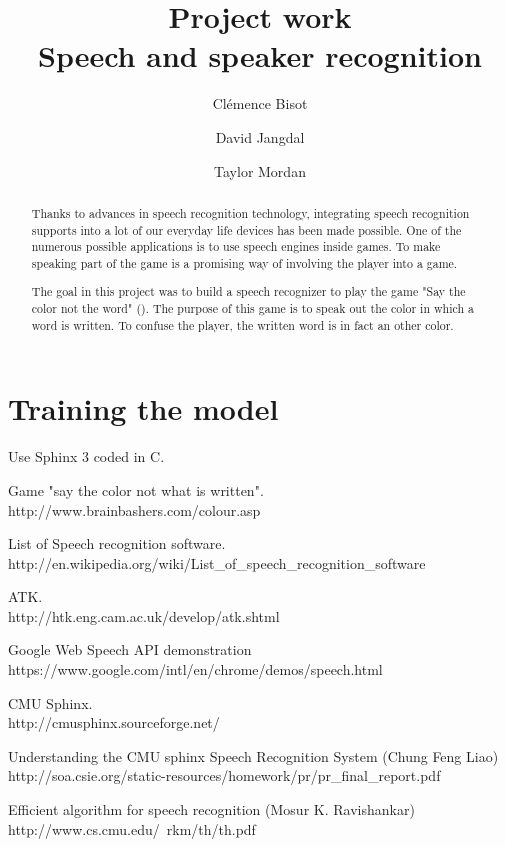 \documentclass{report}
\begin{document}
\title{Project work \\ Speech and speaker recognition}
\author{Cl\'{e}mence Bisot \and David Jangdal \and Taylor Mordan}
\maketitle

\begin{abstract}
Thanks to advances in speech recognition technology, integrating speech recognition supports into a lot of our everyday life devices has been made possible. One of the numerous possible applications is to use speech engines inside games. To make speaking part of the game is a promising way of involving the player into a game. 

The goal in this project was to build a speech recognizer to play the game "Say the color not the word" (\cite{game_site}). The purpose of this game is to speak out the color in which a word is written. To confuse the player, the written word is in fact an other color. 


\end{abstract}





\section*{Training the model}
Use Sphinx 3 coded in C. 

\begin{thebibliography}{40}
 Game "say the color not what is written". \\ http://www.brainbashers.com/colour.asp

 List of Speech recognition software. \\ http://en.wikipedia.org/wiki/List\_of\_speech\_recognition\_software

 ATK. \\ http://htk.eng.cam.ac.uk/develop/atk.shtml

 Google Web Speech API demonstration \\ https://www.google.com/intl/en/chrome/demos/speech.html

 CMU Sphinx. \\ http://cmusphinx.sourceforge.net/

 Understanding the CMU sphinx Speech Recognition System (Chung Feng Liao) \\ http://soa.csie.org/static-resources/homework/pr/pr\_final\_report.pdf

 Efficient algorithm for speech recognition (Mosur K. Ravishankar) \\ http://www.cs.cmu.edu/~rkm/th/th.pdf
\end{thebibliography}
\end{document}
